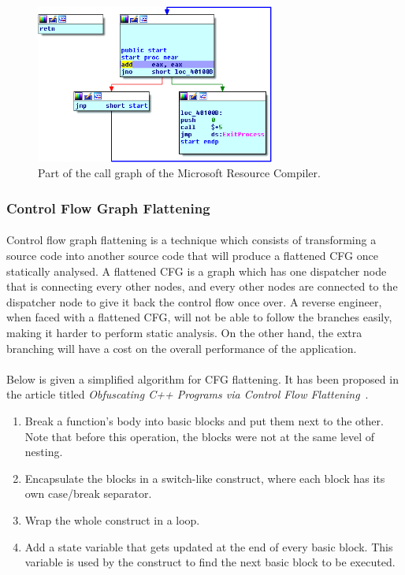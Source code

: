 \begin{figure}[!htb]
	\centering
	\includegraphics[width=0.7\textwidth]{reverse_engineering/control_flow_graph_code_junk.png}
	\caption{Part of the call graph of the Microsoft Resource Compiler.}
	\label{fig:control_flow_graph_junk_code}
\end{figure}

\subsubsection{Control Flow Graph Flattening}
\paragraph{}
Control flow graph flattening is a technique which consists of transforming a source code into another source code that will produce a flattened CFG once statically analysed. A flattened CFG is a graph which has one dispatcher node that is connecting every other nodes, and every other nodes are connected to the dispatcher node to give it back the control flow once over.  A reverse engineer, when faced with a flattened CFG, will not be able to follow the branches easily, making it harder to perform static analysis. On the other hand, the extra branching will have a cost on the overall performance of the application.

\paragraph{}
Below is given a simplified algorithm for CFG flattening. It has been proposed in the article titled \textit{Obfuscating C++ Programs via Control Flow Flattening}~\cite{laszlo2009obfuscating}.
\begin{enumerate}
	\item Break a function's body into basic blocks and put them next to the other. Note that before this operation, the blocks were not at the same level of nesting.
	\item Encapsulate the blocks in a switch-like construct, where each block has its own case/break separator.
	\item Wrap the whole construct in a loop.
	\item Add a state variable that gets updated at the end of every basic block. This variable is used by the construct to find the next basic block to be executed.
\end{enumerate}


